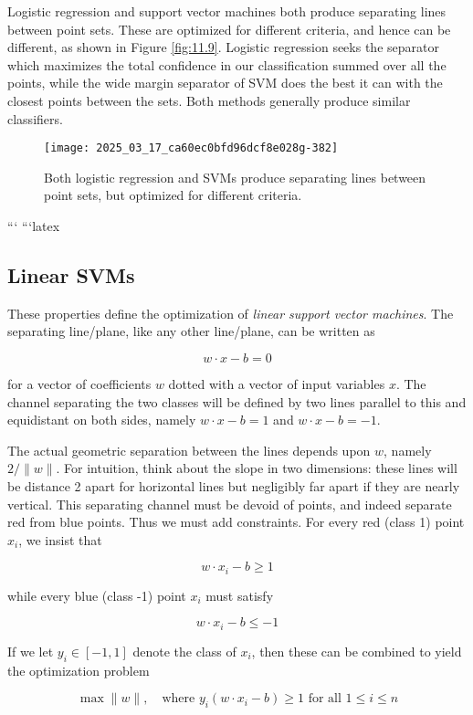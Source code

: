 \documentclass[10pt]{article}
\begin{document}
\begin{enumerate}
Logistic regression and support vector machines both produce separating lines between point sets. These are optimized for different criteria, and hence can be different, as shown in Figure \ref{fig:11.9}. Logistic regression seeks the separator which maximizes the total confidence in our classification summed over all the points, while the wide margin separator of SVM does the best it can with the closest points between the sets. Both methods generally produce similar classifiers.

\begin{figure}[h!]
\centering
\texttt{[image: 2025\_03\_17\_ca60ec0bfd96dcf8e028g-382]}
\caption{Both logistic regression and SVMs produce separating lines between point sets, but optimized for different criteria.}
\end{figure}
```
```latex
\subsection{Linear SVMs}
These properties define the optimization of \textit{linear support vector machines}. The separating line/plane, like any other line/plane, can be written as

\[ 
w \cdot x - b = 0 
\]

for a vector of coefficients $w$ dotted with a vector of input variables $x$. The channel separating the two classes will be defined by two lines parallel to this and equidistant on both sides, namely $w \cdot x - b = 1$ and $w \cdot x - b = -1$. 

The actual geometric separation between the lines depends upon $w$, namely $2 / \| w \|$. For intuition, think about the slope in two dimensions: these lines will be distance 2 apart for horizontal lines but negligibly far apart if they are nearly vertical. This separating channel must be devoid of points, and indeed separate red from blue points. Thus we must add constraints. For every red (class 1) point $x_{i}$, we insist that

\[ 
w \cdot x_{i} - b \geq 1 
\]

while every blue (class -1) point $x_{i}$ must satisfy

\[ 
w \cdot x_{i} - b \leq -1 
\]

If we let $y_{i} \in [-1, 1]$ denote the class of $x_{i}$, then these can be combined to yield the optimization problem

\[
\max \| w \|, \quad \text{where } y_{i} (w \cdot x_{i} - b) \geq 1 \text{ for all } 1 \leq i \leq n
\]


\end{enumerate}
\end{document}

